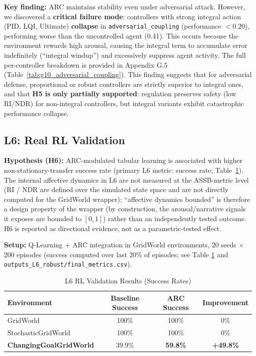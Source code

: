\documentclass{article}
\begin{document}
\textbf{Key finding:} ARC maintains stability even under adversarial attack. However, we discovered a \textbf{critical failure mode}: controllers with strong integral action (PID, LQI, Ultimate) \textbf{collapse} in \texttt{adversarial\_coupling} (performance $< 0.20$), performing worse than the uncontrolled agent (0.41). This occurs because the environment rewards high arousal, causing the integral term to accumulate error indefinitely (``integral windup'') and excessively suppress agent activity. The full per-controller breakdown is provided in Appendix G.5 (Table~\ref{tab:g10_adversarial_coupling}). This finding suggests that for adversarial defense, proportional or robust controllers are strictly superior to integral ones, and that \textbf{H5 is only partially supported}: regulation preserves safety (low RI/NDR) for non-integral controllers, but integral variants exhibit catastrophic performance collapse.

\subsection{L6: Real RL Validation}

\textbf{Hypothesis (H6):} ARC-modulated tabular learning is associated with higher non-stationary-transfer success rate (primary L6 metric: success rate; Table~\ref{tab:l6_results}). The internal affective dynamics in L6 are not measured at the ASSB-metric level (RI / NDR are defined over the simulated state space and are not directly computed for the GridWorld wrapper); ``affective dynamics bounded'' is therefore a design property of the wrapper (by construction, the arousal/narrative signals it exposes are bounded to $[0,1]$) rather than an independently tested outcome. H6 is reported as directional evidence, not as a parametric-tested effect.

\textbf{Setup:} Q-Learning + ARC integration in GridWorld environments, 20 seeds $\times$ 200 episodes (success computed over last 20\% of episodes; see Table \ref{tab:l6_results} and \texttt{outputs\_L6\_robust/final\_metrics.csv}).

\begin{table}[htbp]
\centering
\caption{L6 RL Validation Results (Success Rates)}
\label{tab:l6_results}
\begin{tabular}{@{}lccc@{}}
\toprule
Environment & Baseline Success & ARC Success & Improvement \\ \midrule
GridWorld & 100\% & 100\% & 0\% \\
StochasticGridWorld & 100\% & 100\% & 0\% \\
\textbf{ChangingGoalGridWorld} & 39.9\% & \textbf{59.8\%} & \textbf{+49.8\%} \\ \bottomrule
\end{tabular}
\end{table}
\end{document}
